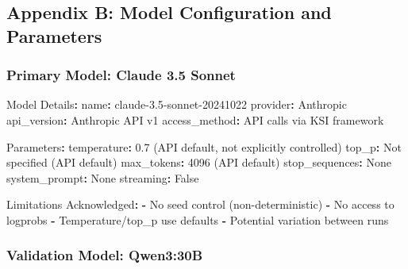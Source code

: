 \documentclass[
  11pt]{article}
\newenvironment{Shaded}{}{}
\newcommand{\AttributeTok}[1]{\textcolor[rgb]{0.49,0.56,0.16}{#1}}
\newcommand{\CharTok}[1]{\textcolor[rgb]{0.25,0.44,0.63}{#1}}
\newcommand{\FunctionTok}[1]{\textcolor[rgb]{0.02,0.16,0.49}{#1}}
\newcommand{\KeywordTok}[1]{\textcolor[rgb]{0.00,0.44,0.13}{\textbf{#1}}}
\begin{document}
\subsection{Appendix B: Model Configuration and
Parameters}\label{appendix-b-model-configuration-and-parameters}

\subsubsection{Primary Model: Claude 3.5
Sonnet}\label{primary-model-claude-3.5-sonnet}

\begin{Shaded}
\begin{Highlighting}[]
\FunctionTok{Model Details}\KeywordTok{:}
\AttributeTok{  }\FunctionTok{name}\KeywordTok{:}\AttributeTok{ claude{-}3.5{-}sonnet{-}20241022}
\AttributeTok{  }\FunctionTok{provider}\KeywordTok{:}\AttributeTok{ Anthropic}
\AttributeTok{  }\FunctionTok{api\_version}\KeywordTok{:}\AttributeTok{ Anthropic API v1}
\AttributeTok{  }\FunctionTok{access\_method}\KeywordTok{:}\AttributeTok{ API calls via KSI framework}

\FunctionTok{Parameters}\KeywordTok{:}
\AttributeTok{  }\FunctionTok{temperature}\KeywordTok{:}\AttributeTok{ 0.7 (API default, not explicitly controlled)}
\AttributeTok{  }\FunctionTok{top\_p}\KeywordTok{:}\AttributeTok{ Not specified (API default)}
\AttributeTok{  }\FunctionTok{max\_tokens}\KeywordTok{:}\AttributeTok{ 4096 (API default)}
\AttributeTok{  }\FunctionTok{stop\_sequences}\KeywordTok{:}\AttributeTok{ None}
\AttributeTok{  }\FunctionTok{system\_prompt}\KeywordTok{:}\AttributeTok{ None}
\AttributeTok{  }\FunctionTok{streaming}\KeywordTok{:}\AttributeTok{ }\CharTok{False}

\FunctionTok{Limitations Acknowledged}\KeywordTok{:}
\AttributeTok{  }\KeywordTok{{-}}\AttributeTok{ No seed control (non{-}deterministic)}
\AttributeTok{  }\KeywordTok{{-}}\AttributeTok{ No access to logprobs}
\AttributeTok{  }\KeywordTok{{-}}\AttributeTok{ Temperature/top\_p use defaults}
\AttributeTok{  }\KeywordTok{{-}}\AttributeTok{ Potential variation between runs}
\end{Highlighting}
\end{Shaded}

\subsubsection{Validation Model:
Qwen3:30B}\label{validation-model-qwen330b}
\end{document}
